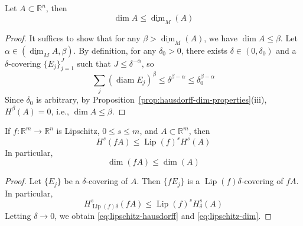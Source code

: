     \begin{theorem}\label{thm:hausdorff-vs-minkowski}
        Let $A\subset \mathbb{R}^{n}$, then
        \[
        \operatorname{dim}A\leq \underline{\operatorname{dim}}_{M}(A)
        \]
    \end{theorem}
    \begin{proof}
        It suffices to show that for any $\beta>\underline{\operatorname{dim}}_{M}(A)$, we have $\operatorname{dim}A\leq \beta$. Let $\alpha \in(\underline{\operatorname{dim}}_{M}A,\beta)$. By definition, for any $\delta_{0}>0$, there exists $\delta \in(0,\delta_{0})$ and a $\delta$-covering $\{ E_{j} \}_{j=1}^{J}$ such that $J\leq \delta ^{-\alpha}$, so
        \[
        \sum _{j}(\operatorname{diam}E_{j})^{\beta}\leq\delta ^{\beta-\alpha}\leq\delta_{0}^{\beta-\alpha}
        \]
        Since $\delta_{0}$ is arbitrary, by Proposition~\ref{prop:hausdorff-dim-properties}(iii), $H^{\beta}(A)=0$, i.e., $\operatorname{dim}A\leq \beta$.
    \end{proof}

    \begin{theorem}\label{thm:lipschitz-dim}
        If $f:\mathbb{R}^{m}\to \mathbb{R}^{n}$ is Lipschitz, $0\leq s\leq m$, and $A\subset \mathbb{R}^{m}$, then
        \begin{equation}
            H^{s}(fA)\leq \operatorname{Lip}(f)^{s}H^{s}(A) \label{eq:lipschitz-hausdorff}
        \end{equation}
        In particular,
        \begin{equation}
            \operatorname{dim}(fA)\leq \operatorname{dim}(A) \label{eq:lipschitz-dim}
        \end{equation}
    \end{theorem}
    \begin{proof}
        Let $\{ E_{j} \}$ be a $\delta$-covering of $A$. Then $\{ fE_{j} \}$ is a $\operatorname{Lip}(f)\delta$-covering of $fA$. In particular,
        \[
        H_{\operatorname{Lip}(f)\delta}^{s}(fA)\leq \operatorname{Lip}(f)^{s}H_{\delta}^{s}(A)
        \]
        Letting $\delta\to 0$, we obtain \eqref{eq:lipschitz-hausdorff} and \eqref{eq:lipschitz-dim}.
    \end{proof}